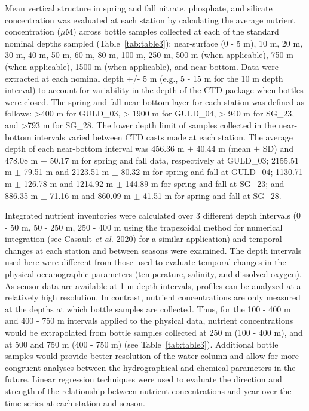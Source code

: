 \documentclass[12pt]{article}\usepackage[]{graphicx}\usepackage[]{color}
\begin{document}
Mean vertical structure in spring and fall nitrate, phosphate, and silicate concentration was evaluated at each station by calculating the average nutrient concentration (\(\mu\)M) across bottle samples collected at each of the standard nominal depths sampled (Table~\ref{tab:table3}): near-surface (0 - 5 m), 10 m, 20 m, 30 m, 40 m, 50 m, 60 m, 80 m, 100 m, 250 m, 500 m (when applicable), 750 m (when applicable), 1500 m (when applicable), and near-bottom. Data were extracted at each nominal depth +/- 5 m (e.g., 5 - 15 m for the 10 m depth interval) to account for variability in the depth of the CTD package when bottles were closed. The spring and fall near-bottom layer for each station was defined as follows: \textgreater400 m for GULD\_03, \textgreater{} 1900 m for GULD\_04, \textgreater{} 940 m for SG\_23, and \textgreater793 m for SG\_28. The lower depth limit of samples collected in the near-bottom intervals varied between CTD casts made at each station. The average depth of each near-bottom interval was 456.36 m \(\pm\) 40.44 m (mean \(\pm\) SD) and 478.08 m \(\pm\) 50.17 m for spring and fall data, respectively at GULD\_03; 2155.51 m \(\pm\) 79.51 m and 2123.51 m \(\pm\) 80.32 m for spring and fall at GULD\_04; 1130.71 m \(\pm\) 126.78 m and 1214.92 m \(\pm\) 144.89 m for spring and fall at SG\_23; and 886.35 m \(\pm\) 71.16 m and 860.09 m \(\pm\) 41.51 m for spring and fall at SG\_28.

Integrated nutrient inventories were calculated over 3 different depth intervals (0 - 50 m, 50 - 250 m, 250 - 400 m using the trapezoidal method for numerical integration (see \protect\hyperlink{ref-casault_2020}{Casault \textit{et al.} 2020}) for a similar application) and temporal changes at each station and between seasons were examined. The depth intervals used here were different from those used to evaluate temporal changes in the physical oceanographic parameters (temperature, salinity, and dissolved oxygen). As sensor data are available at 1 m depth intervals, profiles can be analyzed at a relatively high resolution. In contrast, nutrient concentrations are only measured at the depths at which bottle samples are collected. Thus, for the 100 - 400 m and 400 - 750 m intervals applied to the physical data, nutrient concentrations would be extrapolated from bottle samples collected at 250 m (100 - 400 m), and at 500 and 750 m (400 - 750 m) (see Table~\ref{tab:table3}). Additional bottle samples would provide better resolution of the water column and allow for more congruent analyses between the hydrographical and chemical parameters in the future. Linear regression techniques were used to evaluate the direction and strength of the relationship between nutrient concentrations and year over the time series at each station and season.
\end{document}
